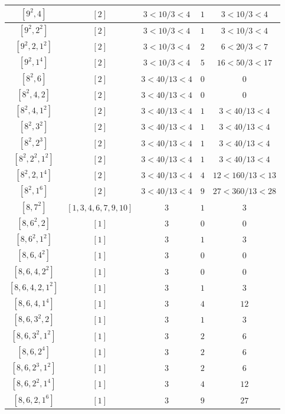 \documentclass{article}%
\begin{document}
\begin{center}
\begin{longtable}{||c|c|c|c|c||}
$[9^{2}, 4]$ & $[2]$ & $3 < 10/3 < 4$ & $1$ & $3 < 10/3 < 4$ \\ \hline 
$[9^{2}, 2^{2}]$ & $[2]$ & $3 < 10/3 < 4$ & $1$ & $3 < 10/3 < 4$ \\ \hline 
$[9^{2}, 2, 1^{2}]$ & $[2]$ & $3 < 10/3 < 4$ & $2$ & $6 < 20/3 < 7$ \\ \hline 
$[9^{2}, 1^{4}]$ & $[2]$ & $3 < 10/3 < 4$ & $5$ & $16 < 50/3 < 17$ \\ \hline 
$[8^{2}, 6]$ & $[2]$ & $3 < 40/13 < 4$ & $0$ & $0$ \\ \hline 
$[8^{2}, 4, 2]$ & $[2]$ & $3 < 40/13 < 4$ & $0$ & $0$ \\ \hline 
$[8^{2}, 4, 1^{2}]$ & $[2]$ & $3 < 40/13 < 4$ & $1$ & $3 < 40/13 < 4$ \\ \hline 
$[8^{2}, 3^{2}]$ & $[2]$ & $3 < 40/13 < 4$ & $1$ & $3 < 40/13 < 4$ \\ \hline 
$[8^{2}, 2^{3}]$ & $[2]$ & $3 < 40/13 < 4$ & $1$ & $3 < 40/13 < 4$ \\ \hline 
$[8^{2}, 2^{2}, 1^{2}]$ & $[2]$ & $3 < 40/13 < 4$ & $1$ & $3 < 40/13 < 4$ \\ \hline 
$[8^{2}, 2, 1^{4}]$ & $[2]$ & $3 < 40/13 < 4$ & $4$ & $12 < 160/13 < 13$ \\ \hline 
$[8^{2}, 1^{6}]$ & $[2]$ & $3 < 40/13 < 4$ & $9$ & $27 < 360/13 < 28$ \\ \hline 
$[8, 7^{2}]$ & $[1, 3, 4, 6, 7, 9, 10]$ & $3$ & $1$ & $3$ \\ \hline 
$[8, 6^{2}, 2]$ & $[1]$ & $3$ & $0$ & $0$ \\ \hline 
$[8, 6^{2}, 1^{2}]$ & $[1]$ & $3$ & $1$ & $3$ \\ \hline 
$[8, 6, 4^{2}]$ & $[1]$ & $3$ & $0$ & $0$ \\ \hline 
$[8, 6, 4, 2^{2}]$ & $[1]$ & $3$ & $0$ & $0$ \\ \hline 
$[8, 6, 4, 2, 1^{2}]$ & $[1]$ & $3$ & $1$ & $3$ \\ \hline 
$[8, 6, 4, 1^{4}]$ & $[1]$ & $3$ & $4$ & $12$ \\ \hline 
$[8, 6, 3^{2}, 2]$ & $[1]$ & $3$ & $1$ & $3$ \\ \hline 
$[8, 6, 3^{2}, 1^{2}]$ & $[1]$ & $3$ & $2$ & $6$ \\ \hline 
$[8, 6, 2^{4}]$ & $[1]$ & $3$ & $2$ & $6$ \\ \hline 
$[8, 6, 2^{3}, 1^{2}]$ & $[1]$ & $3$ & $2$ & $6$ \\ \hline 
$[8, 6, 2^{2}, 1^{4}]$ & $[1]$ & $3$ & $4$ & $12$ \\ \hline 
$[8, 6, 2, 1^{6}]$ & $[1]$ & $3$ & $9$ & $27$ \\ \hline 

\end{longtable}
\end{center}
\end{document}

